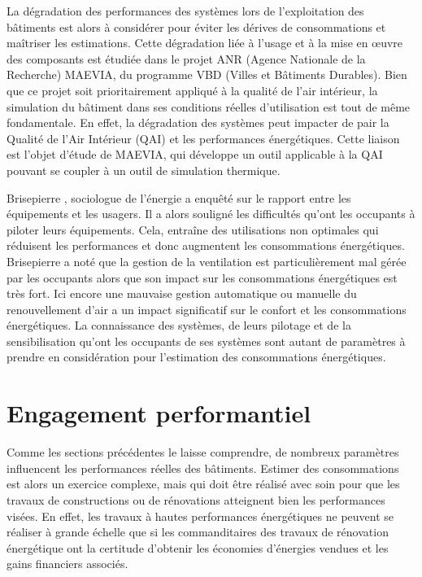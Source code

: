 La dégradation des performances des systèmes lors de l'exploitation des bâtiments est alors à considérer pour éviter les dérives de consommations et maîtriser les estimations. Cette dégradation liée à l'usage et à la mise en œuvre des composants est étudiée dans le projet ANR (Agence Nationale de la Recherche) MAEVIA, du programme VBD (Villes et Bâtiments Durables). Bien que ce projet soit prioritairement appliqué à la qualité de l'air intérieur, la simulation du bâtiment dans ses conditions réelles d'utilisation est tout de même fondamentale. En effet, la dégradation des systèmes peut impacter de pair la Qualité de l'Air Intérieur (QAI) et les performances énergétiques. Cette liaison est l'objet d'étude de MAEVIA, qui développe un outil applicable à la QAI pouvant se coupler à un outil de simulation thermique.

Brisepierre \cite{Brisepierre-11}, sociologue de l'énergie a enquêté sur le rapport entre les équipements et les usagers. Il a alors souligné les difficultés qu'ont les occupants à piloter leurs équipements. Cela, entraîne des utilisations non optimales qui réduisent les performances et donc augmentent les consommations énergétiques. Brisepierre a noté que la gestion de la ventilation est particulièrement mal gérée par les occupants alors que son impact sur les consommations énergétiques est très fort. Ici encore une mauvaise gestion automatique ou manuelle du renouvellement d'air a un impact significatif sur le confort et les consommations énergétiques. La connaissance des systèmes, de leurs pilotage et de la sensibilisation qu'ont les occupants de ses systèmes sont autant de paramètres à prendre en considération pour l'estimation des consommations énergétiques. 

\section{Engagement performantiel}

Comme les sections précédentes le laisse comprendre, de nombreux paramètres influencent les performances réelles des bâtiments. Estimer des consommations est alors un exercice complexe, mais qui doit être réalisé avec soin pour que les travaux de constructions ou de rénovations atteignent bien les performances visées. En effet, les travaux à hautes performances énergétiques ne peuvent se réaliser à grande échelle que si les commanditaires des travaux de rénovation énergétique ont la certitude d'obtenir les économies d'énergies vendues et les gains financiers associés.

